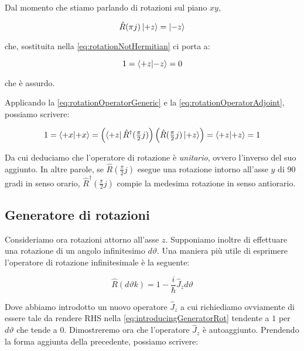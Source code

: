 Dal momento che stiamo parlando di rotazioni sul piano $xy$,

	\begin{equation}
		\hat{R}(\pi j ) \ket{+z} = \ket{-z}
	\end{equation}

che, sostituita nella \eqref{eq:rotationNotHermitian} ci porta a:

	\begin{equation}
		1 = \braket{+z}{-z} = 0
	\end{equation}

che \`e assurdo.

Applicando la \eqref{eq:rotationOperatorGeneric} e la \eqref{eq:rotationOperatorAdjoint}, possiamo scrivere:

	\begin{equation}
		1 = \braket{+x}{+x} = \left ( \bra{+z} \hat{R}^\dagger(\tfrac{\pi}{2} j) \right ) \left ( \hat{R}(\tfrac{\pi}{2} j) \ket{+z} \right ) = \braket{+z}{+z} = 1
	\end{equation}

Da cui deduciamo che l'operatore di rotazione \`e \textit{unitario}, ovvero l'inverso del suo aggiunto. In altre parole, se $\hat{R}(\tfrac{\pi}{2} j)$ esegue una rotazione intorno all'asse $y$ di 90 gradi in senso orario, $\hat{R}^\dagger(\tfrac{\pi}{2} j) $ compie la medesima rotazione in senso antiorario. \\

\subsection{Generatore di rotazioni}

Consideriamo ora rotazioni attorno all'asse $z$. Supponiamo inoltre di effettuare una rotazione di un angolo infinitesimo $d \vartheta$. Una maniera pi\`u utile di esprimere l'operatore di rotazione infinitesimale \`e la seguente:

	\begin{equation} \label{eq:introducingGeneratorRot}
		\hat{R} ( { d \vartheta k } ) = 1 - \frac{i}{\hbar} \hat{J}_z d \vartheta
	\end{equation}

Dove abbiamo introdotto un nuovo operatore $\hat{J}_z$ a cui richiediamo ovviamente di essere tale da rendere RHS nella \eqref{eq:introducingGeneratorRot} tendente a $1$ per $d \vartheta$ che tende a $0$. Dimostreremo ora che l'operatore $\hat{J}_z$ \`e autoaggiunto. Prendendo la forma aggiunta della precedente, possiamo scrivere:

